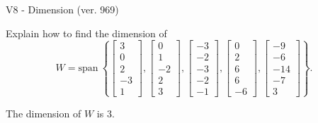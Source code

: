 \begin{exercise}
  \begin{exerciseTitle}V8 - Dimension (ver. 969)\end{exerciseTitle}
  \begin{exerciseStatement}
    Explain how to find the dimension of 
\[W=\mathrm{span}\ \left\{\left[\begin{array}{r}
3 \\
0 \\
2 \\
-3 \\
1
\end{array}\right] , \left[\begin{array}{r}
0 \\
1 \\
-2 \\
2 \\
3
\end{array}\right] , \left[\begin{array}{r}
-3 \\
-2 \\
-3 \\
-2 \\
-1
\end{array}\right] , \left[\begin{array}{r}
0 \\
2 \\
6 \\
6 \\
-6
\end{array}\right] , \left[\begin{array}{r}
-9 \\
-6 \\
-14 \\
-7 \\
3
\end{array}\right]\right\}.\]



  \end{exerciseStatement}
  \begin{exerciseAnswer}
   The dimension of \(W\) is  \(3\).
  


  \end{exerciseAnswer}
\end{exercise}